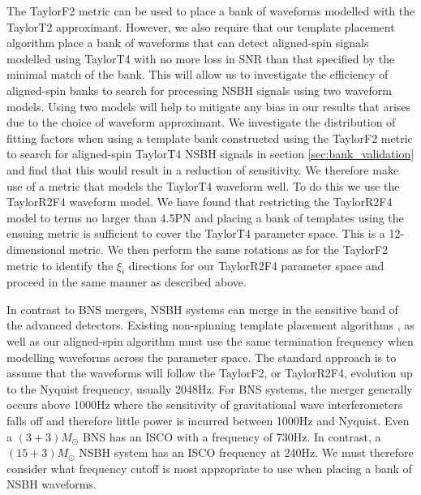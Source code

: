 The TaylorF2 metric can be used to place a bank of waveforms modelled with the
TaylorT2 approximant. However, we also require that our template placement
algorithm place a bank of waveforms that can detect aligned-spin signals
modelled using TaylorT4 with no more loss in \ac{SNR} than that specified by 
the minimal match of the bank. This will allow us to investigate the efficiency 
of aligned-spin banks to search for precessing \ac{NSBH} signals using two 
waveform models. Using two models will help to mitigate any bias in our 
results that arises due to the choice of waveform approximant.
We investigate the distribution of fitting factors when using a template bank
constructed using the TaylorF2 metric to search for aligned-spin TaylorT4
\ac{NSBH} signals in section \ref{sec:bank_validation} and find that this would
result in a reduction of sensitivity. We therefore make use of
a metric that models the TaylorT4 waveform well. To do this we use the
TaylorR2F4 waveform model. We have found that restricting the TaylorR2F4 model
to terms no larger than 4.5\ac{PN} and placing a bank of templates using the
ensuing metric is sufficient to cover the TaylorT4 parameter space. This is
a 12-dimensional metric. We then perform the same rotations as for the TaylorF2
metric to identify the $\xi_i$ directions for our TaylorR2F4 parameter
space and proceed in the same manner as described above.

In contrast to \ac{BNS} mergers, \ac{NSBH} systems can merge in
the sensitive band of the advanced detectors. Existing non-spinning
template placement algorithms
\cite{Poisson:1995ef,Owen:1995tm,Owen:1998dk,Babak:2006ty,
Cokelaer:2007kx}, as well as our aligned-spin algorithm must use the same 
termination frequency when modelling waveforms across the parameter space. 
The standard approach is to assume that the waveforms will follow the TaylorF2, 
or TaylorR2F4, evolution up to the Nyquist frequency, usually 2048Hz. For 
\ac{BNS} systems, the merger generally occurs above 1000Hz where the 
sensitivity of
gravitational wave interferometers falls off and therefore little power is
incurred between 1000Hz and Nyquist. Even a $(3 + 3)M_{\odot}$ \ac{BNS}
has an \ac{ISCO} with a frequency of 730Hz. In contrast, a $(15 + 3)M_{\odot}$
\ac{NSBH} system has an \ac{ISCO} frequency at 240Hz. We must therefore
consider what frequency cutoff is most appropriate to use when placing a bank
of \ac{NSBH} waveforms.


